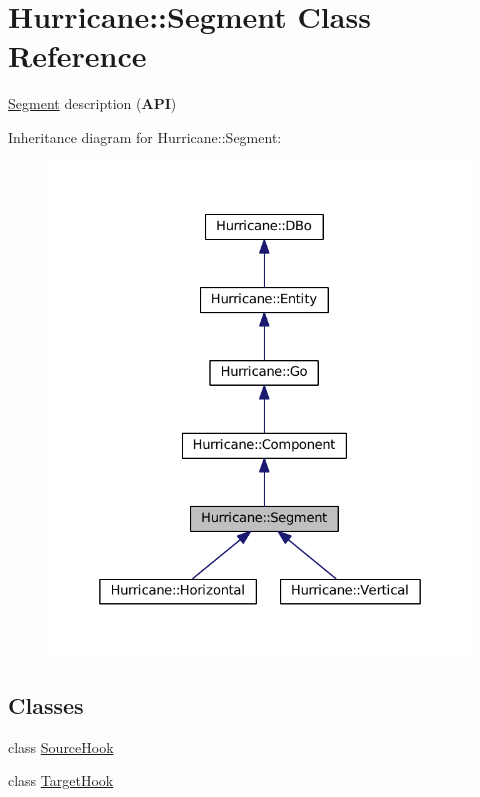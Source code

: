 \hypertarget{classHurricane_1_1Segment}{}\section{Hurricane\+:\+:Segment Class Reference}
\label{classHurricane_1_1Segment}


\mbox{\hyperlink{classHurricane_1_1Segment}{Segment}} description ({\bfseries A\+PI})  




Inheritance diagram for Hurricane\+:\+:Segment\+:\nopagebreak
\begin{figure}[H]
\begin{center}
\leavevmode
\includegraphics[width=325pt]{classHurricane_1_1Segment__inherit__graph}
\end{center}
\end{figure}
\subsection*{Classes}
\begin{DoxyCompactItemize}
\item 
class \mbox{\hyperlink{classHurricane_1_1Segment_1_1SourceHook}{Source\+Hook}}
\item 
class \mbox{\hyperlink{classHurricane_1_1Segment_1_1TargetHook}{Target\+Hook}}
\end{DoxyCompactItemize}

